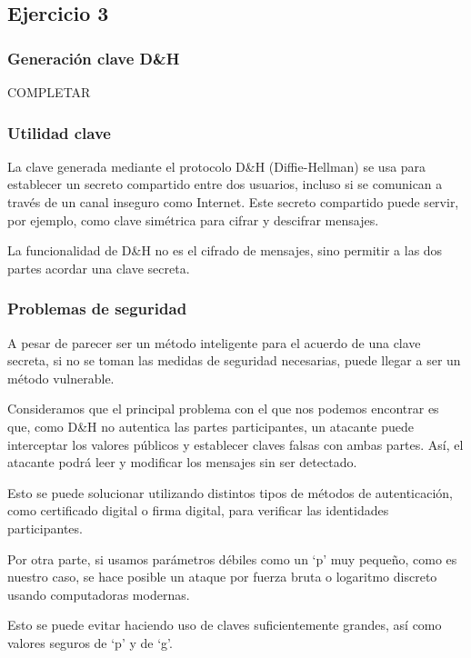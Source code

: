 \subsection{Ejercicio 3}
\graphicspath{ {img/03} }

\subsubsection{Generación clave D\&H}

COMPLETAR

\subsubsection{Utilidad clave}

La clave generada mediante el protocolo D\&H (Diffie-Hellman) se usa para establecer un secreto compartido entre dos usuarios, incluso si se comunican a través de un canal inseguro como Internet. Este secreto compartido puede servir, por ejemplo, como clave simétrica para cifrar y descifrar mensajes. 

La funcionalidad de D\&H no es el cifrado de mensajes, sino permitir a las dos partes acordar una clave secreta. 

\subsubsection{Problemas de seguridad}

A pesar de parecer ser un método inteligente para el acuerdo de una clave secreta, si no se toman las medidas de seguridad necesarias, puede llegar a ser un método vulnerable.  

Consideramos que el principal problema con el que nos podemos encontrar es que, como D\&H no autentica las partes participantes, un atacante puede interceptar los valores públicos y establecer claves falsas con ambas partes. Así, el atacante podrá leer y modificar los mensajes sin ser detectado. 

Esto se puede solucionar utilizando distintos tipos de métodos de autenticación, como certificado digital o firma digital, para verificar las identidades participantes. 

Por otra parte, si usamos parámetros débiles como un ‘p’ muy pequeño, como es nuestro caso, se hace posible un ataque por fuerza bruta o logaritmo discreto usando computadoras modernas. 

Esto se puede evitar haciendo uso de claves suficientemente grandes, así como valores seguros de ‘p’ y de ‘g’. 

